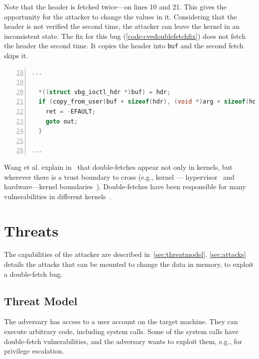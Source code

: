 \documentclass[conference]{IEEEtran}
\begin{document}
Note that the header is fetched twice---on lines 10 and 21. This gives the
opportunity for the attacker to change the values in it. Considering
that the header is not verified the second time, the attacker can
leave the kernel in an inconsistent state. The fix for this bug
(\autoref{code:cvedoublefetchfix}) does not fetch the header the second time. It
copies the header into \texttt{buf} and the second fetch skips it.

\begin{lstlisting}[language=C, caption=CVE-2018-12633 Double Fetch Fix~\cite{cve201812633fix},
  label=code:cvedoublefetchfix,  breaklines=true
  postbreak=\mbox{\textcolor{red}{$\hookrightarrow$}\space},
  numbers=left,basicstyle=\scriptsize, firstnumber=18, xleftmargin=5.0ex]
...

  *((struct vbg_ioctl_hdr *)buf) = hdr;
  if (copy_from_user(buf + sizeof(hdr), (void *)arg + sizeof(hdr), hdr.size_in - sizeof(hdr))) {
    ret = -EFAULT;
    goto out;
  }

...

\end{lstlisting}

Wang et al. explain in~\cite{wang2018survey} that double-fetches appear not only
in kernels, but wherever there is a trust boundary to cross (e.g., kernel ---
hypervisor~\cite{wilhelm2016xenpwn} and hardware---kernel
boundaries~\cite{lu2018untrusted}). Double-fetches have been responsible for many
vulnerabilities in different kernels~\cite{jurczyk2013bochspwn, wang2018survey}.


\section{Threats}

The capabilities of the attacker are described in~\autoref{sec:threatmodel}.
\autoref{sec:attacks} details the attacks that can be mounted to change the
data in memory, to exploit a double-fetch bug.


\subsection{Threat Model}
\label{sec:threatmodel}

The adversary has access to a user account on the target machine. They can
execute arbitrary code, including system calls. Some of the system calls
have double-fetch vulnerabilities, and the adversary wants to exploit them,
e.g., for privilege escalation.
\end{document}
